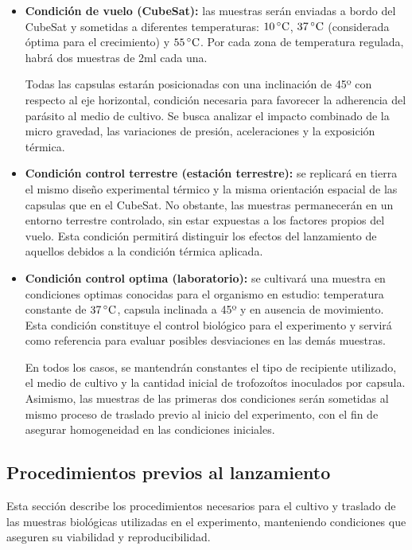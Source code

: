     \begin{itemize}
      \item \textbf{Condición de vuelo (CubeSat):} las muestras serán enviadas a bordo del CubeSat y sometidas a
        diferentes temperaturas: $10\,^\circ\mathrm{C}$, $37\,^\circ\mathrm{C}$ (considerada óptima para el crecimiento) y $55\,^\circ\mathrm{C}$. Por
        cada zona de temperatura regulada, habrá dos muestras de 2ml cada una.

        Todas las capsulas estarán posicionadas con una inclinación de 45º con respecto al eje horizontal, condición
        necesaria para favorecer la adherencia del parásito al medio de cultivo. Se busca analizar el impacto combinado
        de la micro gravedad, las variaciones de presión, aceleraciones y la exposición térmica.

      \item \textbf{Condición control terrestre (estación terrestre):} se replicará en tierra el mismo diseño
        experimental térmico y la misma orientación espacial de las capsulas que en el CubeSat. No obstante, las
        muestras permanecerán en un entorno terrestre controlado, sin estar expuestas a los factores propios del vuelo.
        Esta condición permitirá distinguir los efectos del lanzamiento de aquellos debidos a la condición térmica
        aplicada.

      \item \textbf{Condición control optima (laboratorio):} se cultivará una muestra en condiciones optimas conocidas
        para el organismo en estudio: temperatura constante de $37\,^\circ\mathrm{C}$, capsula inclinada a 45º y en ausencia de
        movimiento. Esta condición constituye el control biológico para el experimento y servirá como referencia para
        evaluar posibles desviaciones en las demás muestras.

        En todos los casos, se mantendrán constantes el tipo de recipiente utilizado, el medio de cultivo y la cantidad
        inicial de trofozoítos inoculados por capsula. Asimismo, las muestras de las primeras dos condiciones serán
        sometidas al mismo proceso de traslado previo al inicio del experimento, con el fin de asegurar homogeneidad en
        las condiciones iniciales.
    \end{itemize}

   \subsection{Procedimientos previos al lanzamiento}
   \label{sec:procedimientos-prev-lanzamiento}
    Esta sección describe los procedimientos necesarios para el cultivo y traslado de las muestras biológicas utilizadas
    en el experimento, manteniendo condiciones que aseguren su viabilidad y reproducibilidad.
 
